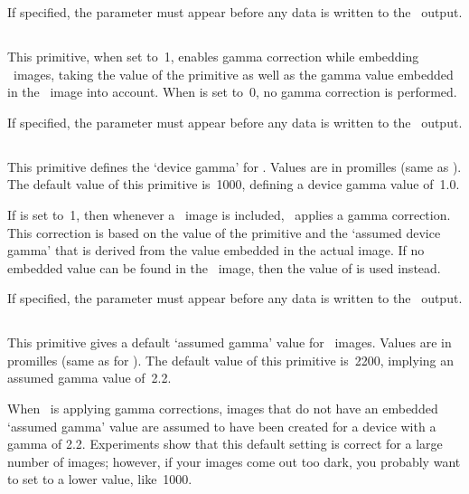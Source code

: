 \documentclass{pdftexmanual}
\begin{document}
If specified, the parameter must appear before any data is written to
the \PDF\ output. 

\subsection{}

This primitive, when set to~1, enables gamma correction while embedding
\PNG\ images, taking the value of the primitive  as
well as the gamma value embedded in the \PNG\ image into account. When
 is set to~0, no gamma correction is
performed.

If specified, the parameter must appear before any data is written to
the \PDF\ output. 

\subsection{}

This primitive defines the `device gamma' for \PDFTEX. Values are in
promilles (same as ). The default value of this primitive
is~1000, defining a device gamma value of~1.0.

If  is set to~1, then whenever a \PNG\ image is
included, \PDFTEX\ applies a gamma correction. This correction is based
on the value of the  primitive and the `assumed device
gamma' that is derived from the value embedded in the actual image. If
no embedded value can be found in the \PNG\ image, then the value of
 is used instead.

If specified, the parameter must appear before any data is written to
the \PDF\ output. 

\subsection{}

This primitive gives a default `assumed gamma' value for \PNG\ images.
Values are in promilles (same as for ). The default value
of this primitive is~2200, implying an assumed gamma value of~2.2.

When \PDFTEX\ is applying gamma corrections, images that do not have an
embedded `assumed gamma' value are assumed to have been created for a
device with a gamma of 2.2. Experiments show that this default setting
is correct for a large number of images; however, if your images come
out too dark, you probably want to set  to a lower
value, like~1000.
\end{document}

